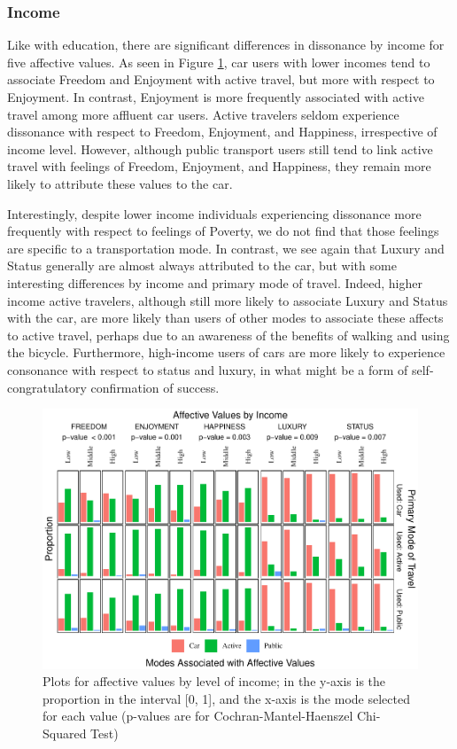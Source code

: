 \documentclass[]{elsarticle} %
\begin{document}
\hypertarget{income-1}{%
\subsubsection{Income}\label{income-1}}

Like with education, there are significant differences in dissonance by
income for five affective values. As seen in Figure
\ref{fig:bar-plots-by-income}, car users with lower incomes tend to
associate Freedom and Enjoyment with active travel, but more with
respect to Enjoyment. In contrast, Enjoyment is more frequently
associated with active travel among more affluent car users. Active
travelers seldom experience dissonance with respect to Freedom,
Enjoyment, and Happiness, irrespective of income level. However,
although public transport users still tend to link active travel with
feelings of Freedom, Enjoyment, and Happiness, they remain more likely
to attribute these values to the car.

Interestingly, despite lower income individuals experiencing dissonance
more frequently with respect to feelings of Poverty, we do not find that
those feelings are specific to a transportation mode. In contrast, we
see again that Luxury and Status generally are almost always attributed
to the car, but with some interesting differences by income and primary
mode of travel. Indeed, higher income active travelers, although still
more likely to associate Luxury and Status with the car, are more likely
than users of other modes to associate these affects to active travel,
perhaps due to an awareness of the benefits of walking and using the
bicycle. Furthermore, high-income users of cars are more likely to
experience consonance with respect to status and luxury, in what might
be a form of self-congratulatory confirmation of success.

\begin{figure}
\centering
\includegraphics{Dissonance_Santiago_v3_files/figure-latex/figure-bar-plots-by-attribute-and-income-1.pdf}
\caption{\label{fig:bar-plots-by-income}Plots for affective values by
level of income; in the y-axis is the proportion in the interval {[}0,
1{]}, and the x-axis is the mode selected for each value (p-values are
for Cochran-Mantel-Haenszel Chi-Squared Test)}
\end{figure}
\end{document}
